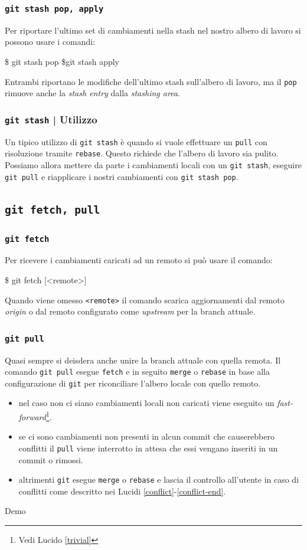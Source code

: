\documentclass{beamer}
\begin{document}
\begin{frame}
  \frametitle{\texttt{git stash pop, apply}}
  Per riportare l'ultimo set di cambiamenti nella stash nel nostro albero di
  lavoro si possono usare i comandi:
  \begin{semiverbatim}
  \$ git stash pop  \$git stash apply
  \end{semiverbatim}
  Entrambi riportano le modifiche dell'ultimo stash sull'albero di lavoro, ma il
  \texttt{pop} rimuove anche la \emph{stash entry} dalla \emph{stashing area}.
\end{frame}

\begin{frame}
  \frametitle{\texttt{git stash} | Utilizzo}
  Un tipico utilizzo di \texttt{git stash} \`e quando si vuole effettuare un
  \texttt{pull} con risoluzione tramite \texttt{rebase}. Questo richiede che
  l'albero di lavoro sia pulito. Possiamo allora mettere da parte i cambiamenti
  locali con un \texttt{git stash}, eseguire \texttt{git pull} e riapplicare i
  nostri cambiamenti con \texttt{git stash pop}.
\end{frame}

\subsection{\texttt{git fetch, pull}}
\begin{frame}
  \frametitle{\texttt{git fetch}}
  Per ricevere i cambiamenti caricati ad un remoto si pu\`o usare il comando:
  \begin{semiverbatim}
  \$ git fetch [<remote>]
  \end{semiverbatim} \pause
  Quando viene omesso \texttt{<remote>} il comando scarica aggiornamenti dal
  remoto \emph{origin} o dal remoto configurato come \emph{upstream} per la
  branch attuale.
\end{frame}

\begin{frame}
  \frametitle{\texttt{git pull}}
  Quasi sempre si deisdera anche unire la branch attuale con quella remota.
  Il comando \texttt{git pull} esegue \texttt{fetch} e in seguito \texttt{merge}
  o \texttt{rebase} in base alla configurazione di \texttt{git} per riconciliare l'albero
  locale con quello remoto. \\ \pause
  \begin{itemize}
    \item nel caso non ci siano cambiamenti locali non caricati viene eseguito
      un \emph{fast-forward}\footnote{Vedi Lucido \ref{trivial}}.
    \item se ci sono cambiamenti non presenti in alcun commit che causerebbero
      conflitti il \texttt{pull} viene interrotto in attesa che essi vengano
      inseriti in un commit o rimossi.
    \item altrimenti \texttt{git} esegue \texttt{merge} o \texttt{rebase} e lascia il
      controllo all'utente in caso di conflitti come descritto nei
      Lucidi \ref{conflict}-\ref{conflict-end}.
  \end{itemize}
\end{frame}

\begin{frame}[c]
  \centering
  Demo
\end{frame}
\end{document}
